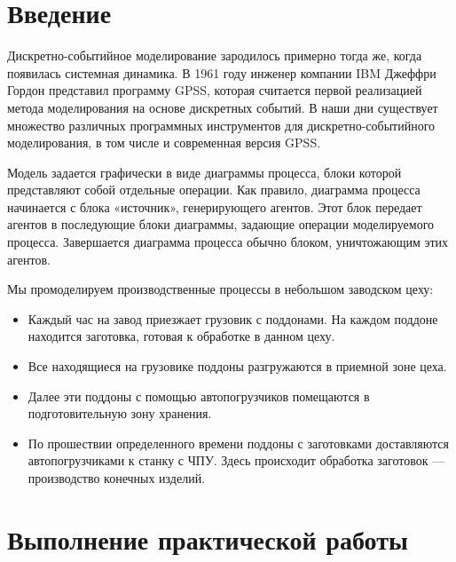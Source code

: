 \graphicspath{{./fourth/img/}} %

\section*{\LARGE Введение}
Дискретно-событийное моделирование зародилось примерно тогда же, когда
появилась системная динамика. В 1961 году инженер компании IBM Джеффри
Гордон представил программу GPSS, которая считается первой реализацией
метода моделирования на основе дискретных событий. В наши дни существует
множество различных программных инструментов для дискретно-событийного
моделирования, в том числе и современная версия GPSS.\par
Модель задается графически в виде диаграммы процесса, блоки которой
представляют собой отдельные операции. Как правило, диаграмма процесса
начинается с блока «источник», генерирующего агентов. Этот блок передает
агентов в последующие блоки диаграммы, задающие операции моделируемого
процесса. Завершается диаграмма процесса обычно блоком, уничтожающим
этих агентов.\par
Мы промоделируем производственные процессы в небольшом заводском цеху:

\begin{itemize}
	\item Каждый час на завод приезжает грузовик с поддонами. На каждом
		поддоне находится заготовка, готовая к обработке в данном цеху.
	\item Все находящиеся на грузовике поддоны разгружаются
		в приемной зоне цеха.
	\item  Далее эти поддоны с помощью автопогрузчиков помещаются в
		подготовительную зону хранения.
	\item По прошествии определенного времени поддоны с заготовками
		доставляются автопогрузчиками к станку с ЧПУ. Здесь происходит
		обработка заготовок --- производство конечных изделий.
\end{itemize}

\clearpage

\section*{\LARGE Выполнение практической работы}

